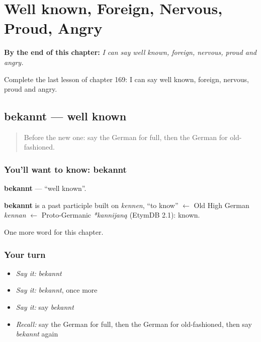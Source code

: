 
\chapter{Well known, Foreign, Nervous, Proud, Angry}
\label{ch:ge-well-known-foreign-nervous-proud-angry}

\begin{chapteropening}
\textbf{By the end of this chapter:} \emph{I can say well known, foreign, nervous, proud and angry.}

Complete the last lesson of chapter 169: I can say well known, foreign, nervous, proud and angry.
\end{chapteropening}

\section[bekannt]{bekannt — well known}

\label{lesson:GE-C169-bekannt}



\begin{quote}
Before the new one: say the German for full, then the German for old-fashioned.
\end{quote}

\subsection*{You'll want to know: bekannt}
\textbf{bekannt} — \textquotedblleft{}well known\textquotedblright{}.

\begin{cousinweb}
\textbf{bekannt} is a past participle built on \emph{kennen}, \textquotedblleft{}to know\textquotedblright{} $\leftarrow$ Old High German \emph{kennan} $\leftarrow$ Proto-Germanic \emph{*kannijaną} (EtymDB 2.1): known.
\end{cousinweb}

\begin{grammarlens}[title={What you've built}]
One more word for this chapter.
\end{grammarlens}

\subsection*{Your turn}
\begin{itemize}
\raggedright
  \item \emph{Say it:} \emph{bekannt}
  \item \emph{Say it:} \emph{bekannt}, once more
  \item \emph{Say it:} say \emph{bekannt}
  \item \emph{Recall:} say the German for full, then the German for old-fashioned, then say \emph{bekannt} again
\end{itemize}

